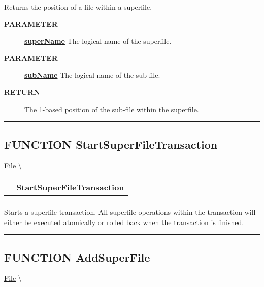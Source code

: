 \par
Returns the position of a file within a superfile.

\par
\begin{description}
\item [\colorbox{tagtype}{\color{white} \textbf{\textsf{PARAMETER}}}] \textbf{\underline{superName}} The logical name of the superfile.
\item [\colorbox{tagtype}{\color{white} \textbf{\textsf{PARAMETER}}}] \textbf{\underline{subName}} The logical name of the sub-file.
\item [\colorbox{tagtype}{\color{white} \textbf{\textsf{RETURN}}}] \textbf{\underline{}} The 1-based position of the sub-file within the superfile.
\end{description}

\rule{\linewidth}{0.5pt}
\subsection*{\textsf{\colorbox{headtoc}{\color{white} FUNCTION}
StartSuperFileTransaction}}

\hypertarget{ecldoc:file.startsuperfiletransaction}{}
\hspace{0pt} \hyperlink{ecldoc:File}{File} \textbackslash 

{\renewcommand{\arraystretch}{1.5}
\begin{tabularx}{\textwidth}{|>{\raggedright\arraybackslash}l|X|}
\hline
\hspace{0pt}\mytexttt{\color{red} } & \textbf{StartSuperFileTransaction} \\
\hline
\multicolumn{2}{|>{\raggedright\arraybackslash}X|}{\hspace{0pt}\mytexttt{\color{param} ()}} \\
\hline
\end{tabularx}
}

\par
Starts a superfile transaction. All superfile operations within the transaction will either be executed atomically or rolled back when the transaction is finished.


\rule{\linewidth}{0.5pt}
\subsection*{\textsf{\colorbox{headtoc}{\color{white} FUNCTION}
AddSuperFile}}

\hypertarget{ecldoc:file.addsuperfile}{}
\hspace{0pt} \hyperlink{ecldoc:File}{File} \textbackslash 

